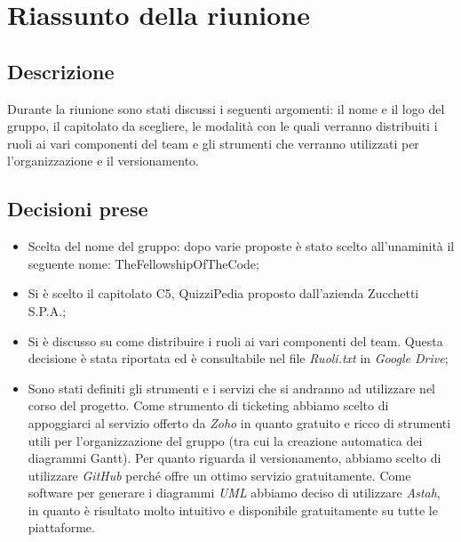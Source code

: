 \section{Riassunto della riunione}
\subsection{Descrizione}

Durante la riunione sono stati discussi i seguenti argomenti: il nome e il logo del gruppo, il capitolato da scegliere, le modalità con le quali verranno distribuiti i ruoli ai vari componenti del team e gli strumenti che verranno utilizzati per l'organizzazione e il versionamento.

\subsection{Decisioni prese}
\begin{itemize}
\item Scelta del nome del gruppo: dopo varie proposte è stato scelto all'unaminità il seguente nome: TheFellowshipOfTheCode;
\item Si è scelto il capitolato C5, QuizziPedia proposto dall'azienda Zucchetti S.P.A.;
\item Si è discusso su come distribuire i ruoli ai vari componenti del team. Questa decisione è stata riportata ed è consultabile nel file \textsl{Ruoli.txt} in \textit{Google Drive};
\item Sono stati definiti gli strumenti e i servizi che si andranno ad utilizzare nel corso del progetto. Come strumento di ticketing abbiamo scelto di appoggiarci al servizio offerto da \textit{Zoho} in quanto gratuito e ricco di strumenti utili per l'organizzazione del gruppo (tra cui la creazione automatica dei diagrammi Gantt). Per quanto riguarda il versionamento, abbiamo scelto di utilizzare \textit{GitHub} perché offre un ottimo servizio gratuitamente. Come software per generare i diagrammi \textit{UML} abbiamo deciso di utilizzare \textit{Astah}, in quanto è risultato molto intuitivo e disponibile gratuitamente su tutte le piattaforme.
\end{itemize}